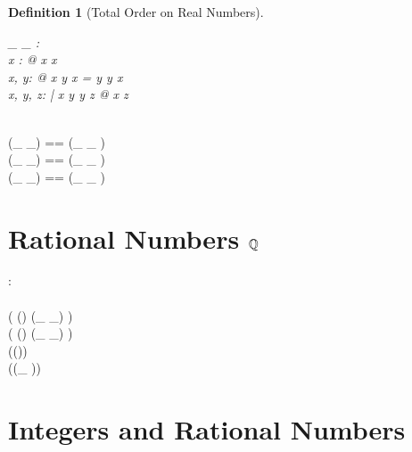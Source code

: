 \documentclass[12pt]{scrartcl}
\newtheorem{zdef}{Definition}[section]
\begin{document}
\begin{zdef}[Total Order on Real Numbers]
  \label{zdef:order-on-reals}
  \begin{axdef}
    \_ \alt \_ : \Real \rel \Real\\
    \where
    \forall x : \Real @ \lnot x \alt x\\
    \forall x, y: \Real @ x \alt y \lor x = y \lor y \alt x\\
    \forall x, y, z: \Real | x \alt y \land y \alt z @ x \alt z \\
    \azero \alt \aone\\
  \end{axdef}
\end{zdef}

\begin{zed}
  (\_ \aleq \_) == (\_ \alt \_ ) \cup \id \Real \\
  (\_ \agt \_) == (\_ \alt \_ ) \inv \\
  (\_ \ageq \_) == (\_ \agt \_ ) \cup \id \Real \\
\end{zed}

\section{Rational Numbers $\mathbb{Q}$}
\label{sec:rational-numbers}


\begin{axdef}
  \Rational : \power \Real
  \where
  \azero \in \Rational\\
  \aone \in \Rational\\
  \ran ( (\Rational \cross \Rational) \dres (\_ \aplus \_) ) \subset \Rational\\
  \ran ( (\Rational \cross \Rational) \dres (\_ \amult \_) ) \subset \Rational\\
  \ran (\Rational \dres (\aneg ))  \subset \Rational\\
  \ran (\Rational \dres (\_ \ainv ))  \subset \Rational\\
\end{axdef}

\section{Integers and Rational Numbers}
\label{sec:integers-and-rationals}

\end{document}
